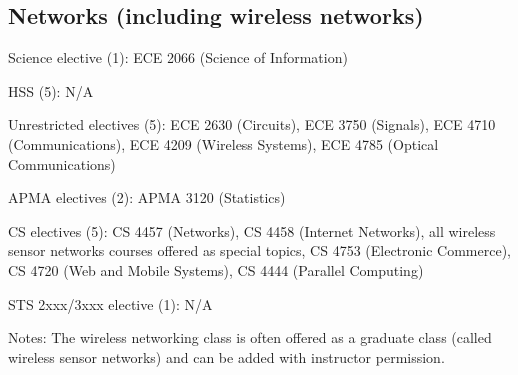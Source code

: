 \subsection{Networks (including wireless networks)}
\begin{itemlist}
\item Science elective (1): ECE 2066 (Science of Information)
\item HSS (5): N/A
\item Unrestricted electives (5): ECE 2630 (Circuits), ECE 3750
  (Signals), ECE 4710 (Communications), ECE 4209 (Wireless Systems),
  ECE 4785 (Optical Communications)
\item APMA electives (2): APMA 3120 (Statistics)
\item CS electives (5): CS 4457 (Networks), CS 4458 (Internet
  Networks), all wireless sensor networks courses offered as special
  topics, CS 4753 (Electronic Commerce), CS 4720 (Web and Mobile
  Systems), CS 4444 (Parallel Computing)
\item STS 2xxx/3xxx elective (1): N/A
\item Notes: The wireless networking class is often offered as a graduate class (called wireless sensor networks) and can be added with instructor permission. 
\end{itemlist}

